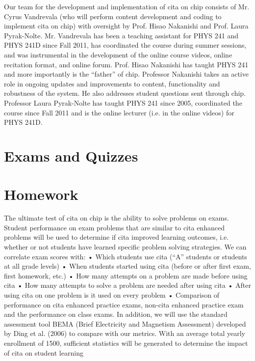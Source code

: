 Our team for the development and implementation of \gls{cita} on \gls{chip} consists of Mr. Cyrus
Vandrevala (who will perform content development and coding to implement \gls{cita} on \gls{chip})
with oversight by Prof. Hisao Nakanishi and Prof. Laura Pyrak-Nolte. Mr. Vandrevala has been
a teaching assistant for PHYS 241 and PHYS 241D since Fall 2011, has coordinated the course
during summer sessions, and was instrumental in the development of the online course videos,
online recitation format, and online forum. Prof. Hisao Nakanishi has taught PHYS 241 and
more importantly is the “father” of \gls{chip}. Professor Nakanishi takes an active role in ongoing
updates and improvements to content, functionality and robustness of the system. He also
addresses student questions sent through \gls{chip}. Professor Laura Pyrak-Nolte has taught PHYS
241 since 2005, coordinated the course since Fall 2011 and is the online lecturer (i.e. in the
online videos) for PHYS 241D.

\section{Exams and Quizzes}



\section{Homework}

The ultimate test of \gls{cita} on \gls{chip} is the ability to solve problems on exams. Student
performance on exam problems that are similar to \gls{cita} enhanced problems will be used to
determine if \gls{cita} improved learning outcomes, i.e. whether or not students have learned
specific problem solving strategies. We can correlate exam scores with:
• Which students use \gls{cita} (“A” students or students at all grade levels)
• When students started using \gls{cita} (before or after first exam, first homework, etc.)
• How many attempts on a problem are made before using \gls{cita}
• How many attempts to solve a problem are needed after using \gls{cita}
• After using \gls{cita} on one problem is it used on every problem
• Comparison of performance on \gls{cita} enhanced practice exams, non-\gls{cita} enhanced
practice exam and the performance on class exams.
In addition, we will use the standard assessment tool BEMA (Brief Electricity and Magnetism
Assessment) developed by Ding et al. (2006) to compare with our metrics. With an average total
yearly enrollment of 1500, sufficient statistics will be generated to determine the impact of \gls{cita}
on student learning

